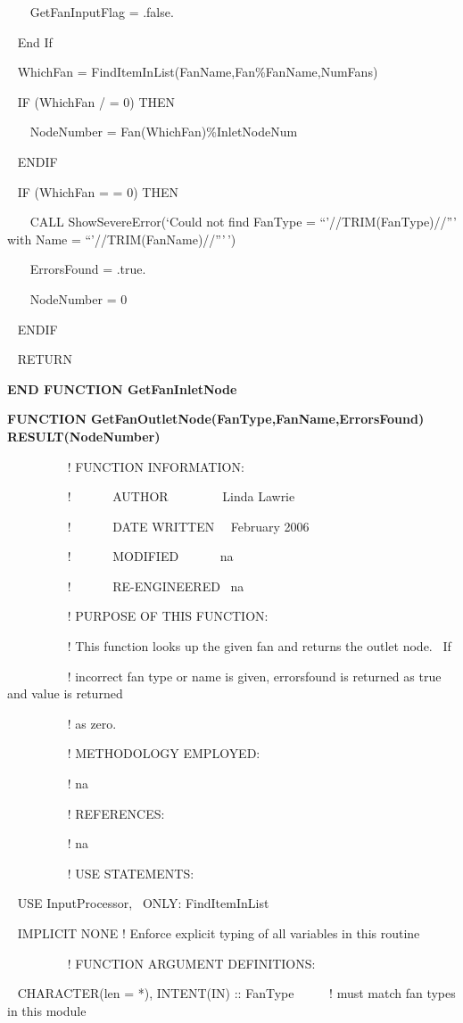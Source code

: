 ~~~ GetFanInputFlag = .false.

~ End If

~ WhichFan = FindItemInList(FanName,Fan\%FanName,NumFans)

~ IF (WhichFan / = 0) THEN

~~~ NodeNumber = Fan(WhichFan)\%InletNodeNum

~ ENDIF

~ IF (WhichFan = = 0) THEN

~~~ CALL ShowSevereError(`Could not find FanType = ``'//TRIM(FanType)//''' with Name = ``'//TRIM(FanName)//'''\,')

~~~ ErrorsFound = .true.

~~~ NodeNumber = 0

~ ENDIF

~ RETURN

\textbf{END FUNCTION GetFanInletNode}

\textbf{FUNCTION GetFanOutletNode(FanType,FanName,ErrorsFound) RESULT(NodeNumber)}

~~~~~~~~~ ! FUNCTION INFORMATION:

~~~~~~~~~ !~~~~~~ AUTHOR~~~~~~~~ Linda Lawrie

~~~~~~~~~ !~~~~~~ DATE WRITTEN~~ February 2006

~~~~~~~~~ !~~~~~~ MODIFIED~~~~~~ na

~~~~~~~~~ !~~~~~~ RE-ENGINEERED~ na

~~~~~~~~~ ! PURPOSE OF THIS FUNCTION:

~~~~ ~~~~~! This function looks up the given fan and returns the outlet node.~ If

~~~~~~~~~ ! incorrect fan type or name is given, errorsfound is returned as true and value is returned

~~~~~~~~~ ! as zero.

~~~~~~~~~ ! METHODOLOGY EMPLOYED:

~~~~~~~~~ ! na

~~~ ~~~~~~! REFERENCES:

~~~~~~~~~ ! na

~~~~~~~~~ ! USE STATEMENTS:

~ USE InputProcessor,~ ONLY: FindItemInList

~ IMPLICIT NONE ! Enforce explicit typing of all variables in this routine

~~~~~~~~~ ! FUNCTION ARGUMENT DEFINITIONS:

~ CHARACTER(len = *), INTENT(IN) :: FanType~~~~~ ! must match fan types in this module

